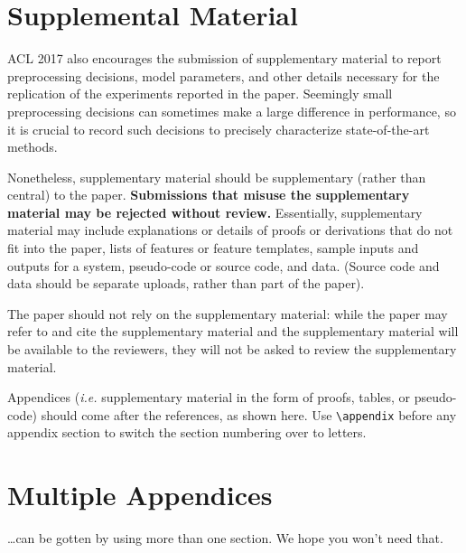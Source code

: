 \documentclass[11pt,a4paper]{article}
\begin{document}
\section{Supplemental Material}
\label{sec:supplemental}
ACL 2017 also encourages the submission of supplementary material
to report preprocessing decisions, model parameters, and other details
necessary for the replication of the experiments reported in the 
paper. Seemingly small preprocessing decisions can sometimes make
a large difference in performance, so it is crucial to record such
decisions to precisely characterize state-of-the-art methods.

Nonetheless, supplementary material should be supplementary (rather
than central) to the paper. {\bf Submissions that misuse the supplementary 
material may be rejected without review.}
Essentially, supplementary material may include explanations or details
of proofs or derivations that do not fit into the paper, lists of
features or feature templates, sample inputs and outputs for a system,
pseudo-code or source code, and data. (Source code and data should
be separate uploads, rather than part of the paper).

The paper should not rely on the supplementary material: while the paper
may refer to and cite the supplementary material and the supplementary material will be available to the
reviewers, they will not be asked to review the
supplementary material.

Appendices ({\em i.e.} supplementary material in the form of proofs, tables,
or pseudo-code) should come after the references, as shown here. Use
\verb|\appendix| before any appendix section to switch the section
numbering over to letters.

\section{Multiple Appendices}
\dots can be gotten by using more than one section. We hope you won't
need that.
\end{document}
